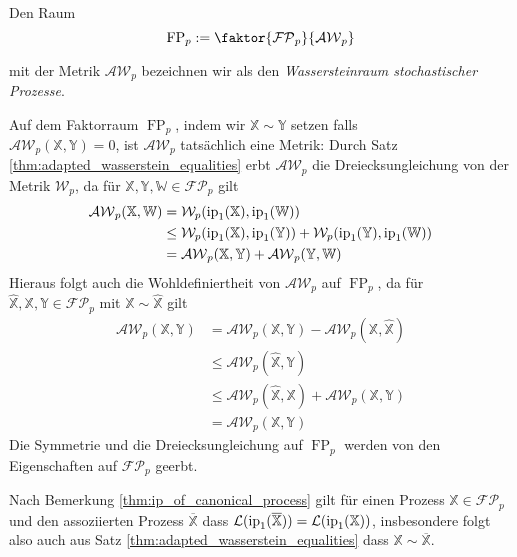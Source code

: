 \begin{definition}
    Den Raum
    $$\operatorname{FP}_p := \faktor{\mathcal{FP}_p}{\mathcal{AW}_p}$$

    mit der Metrik $\mathcal{AW}_p$ bezeichnen wir als den \emph{Wassersteinraum stochastischer Prozesse}.
\end{definition}
\begin{remark}
    Auf dem Faktorraum $\operatorname{FP}_p$, indem wir $\mathbb{X} \sim \mathbb{Y}$ setzen falls \\
     $\mathcal{AW}_p(\mathbb{X}, \mathbb{Y})=0$, ist $\mathcal{AW}_p$ tatsächlich eine Metrik: Durch Satz \ref{thm:adapted_wasserstein_equalities} erbt $\mathcal{AW}_p$ die Dreiecksungleichung von der Metrik $\mathcal{W}_p$, da für $\mathbb{X,Y,W} \in \mathcal{FP}_p$ gilt 
    \begin{align*}
        \mathcal{AW}_p(\mathbb{X,W}) &= \mathcal{W}_p(\operatorname{ip}_1(\mathbb{X}), \operatorname{ip}_1(\mathbb{W})) \\
        &\leq \mathcal{W}_p(\operatorname{ip}_1(\mathbb{X}), \operatorname{ip}_1(\mathbb{Y})) + \mathcal{W}_p(\operatorname{ip}_1(\mathbb{Y}), \operatorname{ip}_1(\mathbb{W})) \\
        &= \mathcal{AW}_p(\mathbb{X,Y}) + \mathcal{AW}_p(\mathbb{Y, W})
    \end{align*}
    Hieraus folgt auch die Wohldefiniertheit von $\mathcal{AW}_p$ auf $\operatorname{FP}_p$, da für $\hat{\mathbb{X}}, \mathbb{X,Y} \in \mathcal{FP}_p$ mit $\mathbb{X}\sim\hat{\mathbb{X}}$ gilt
    \begin{align*}
        \mathcal{AW}_p(\mathbb{X,Y}) &= \mathcal{AW}_p(\mathbb{X}, \mathbb{Y}) - \mathcal{AW}_p(\mathbb{X}, \hat{\mathbb{X}}) \\
        &\leq \mathcal{AW}_p(\hat{\mathbb{X}}, \mathbb{Y}) \\
        &\leq \mathcal{AW}_p(\hat{\mathbb{X}}, \mathbb{X}) + \mathcal{AW}_p(\mathbb{X,Y}) \\
        &= \mathcal{AW}_p(\mathbb{X,Y})
    \end{align*}
    Die Symmetrie und die Dreiecksungleichung auf $\operatorname{FP}_p$ werden von den Eigenschaften auf $\mathcal{FP}_p$ geerbt. 
    
    Nach Bemerkung \ref{thm:ip_of_canonical_process} gilt für einen Prozess $\mathbb{X} \in \mathcal{FP}_p$ und den assoziierten Prozess $\overline{\mathbb{X}}$ dass $\mathcal{L}(\operatorname{ip}_1(\overline{\mathbb{X}})) = \mathcal{L}(\operatorname{ip}_1(\mathbb{X}))$, insbesondere folgt also auch aus Satz \ref{thm:adapted_wasserstein_equalities} dass $\mathbb{X} \sim \overline{\mathbb{X}}$.
\end{remark}
